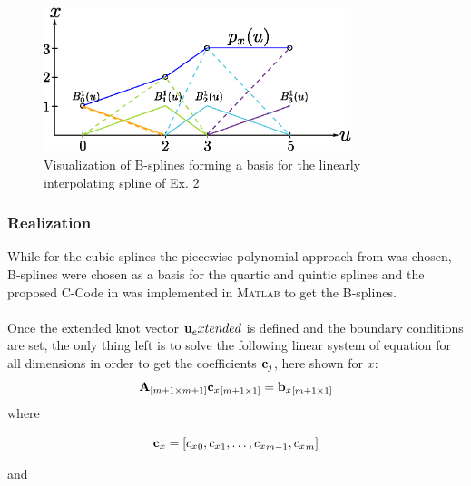 \begin{figure}[H]
	\centering
    \includegraphics[width = 0.8\textwidth]{graphics/BSpline.eps}
  \caption{Visualization of B-splines forming a basis for the linearly interpolating spline of Ex. 2}
  \label{fig:BSpline}
\end{figure} 

\subsubsection{Realization}
While for the cubic splines the piecewise polynomial approach from \cite{engeln} was chosen, B-splines were chosen as a basis for the quartic and quintic splines and the proposed C-Code in \cite{biagiotti} was implemented in \textsc{Matlab} to get the B-splines.\\
\\


Once the extended knot vector ${\bf u}_extended$ is defined and the boundary conditions are set, the only thing left is to solve the following linear system of equation for all dimensions in order to get the coefficients ${\bf c}_j$,  here shown for $x$:
\begin{equation}
{\bf A}_{[m+1\times m+1] }{{\bf c}_x}_{[m+1\times 1]}={{\bf b}_x}_{[m+1 \times 1]}
\end{equation}
where


\begin{equation*}
    {\bf c}_x = [ {c_x}_{0}, {c_x}_{1}, \ldots, {c_x}_{m-1}, {c_x}_{m}]
\end{equation*}

and

